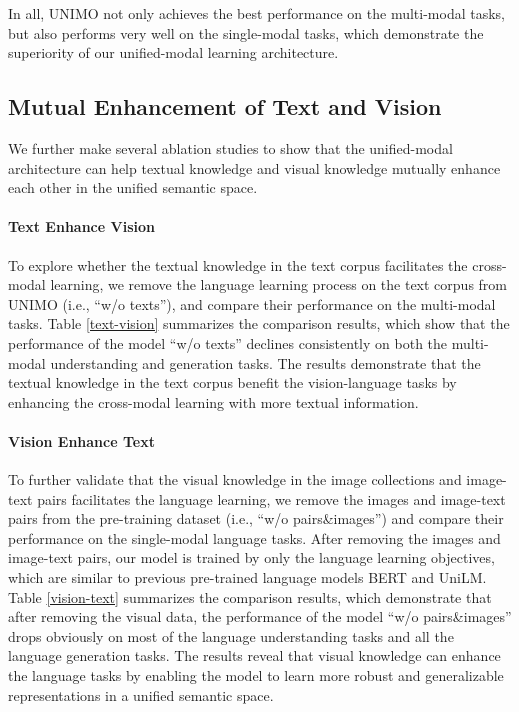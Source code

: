 \documentclass[11pt,a4paper]{article}
\begin{document}
In all, UNIMO not only achieves the best performance on the multi-modal tasks, but also performs very well on the single-modal tasks, which demonstrate the superiority of our unified-modal learning architecture.





\subsection{Mutual Enhancement of Text and Vision}
We further make several ablation studies to show that the unified-modal architecture can help textual knowledge and visual knowledge mutually enhance each other in the unified semantic space. 


\paragraph{Text Enhance Vision}
To explore whether the textual knowledge in the text corpus facilitates the cross-modal learning, we remove the language learning process on the text corpus from UNIMO (i.e., ``w/o texts''), and compare their performance on the multi-modal tasks.
Table \ref{text-vision} summarizes the comparison results, which show that the performance of the model ``w/o texts'' declines consistently on both the multi-modal understanding and generation tasks.
The results demonstrate that the textual knowledge in the text corpus benefit the vision-language tasks by enhancing the cross-modal learning with more textual information.



\paragraph{Vision Enhance Text}
To further validate that the visual knowledge in the image collections and image-text pairs facilitates the language learning, we remove the images and image-text pairs from the pre-training dataset (i.e., ``w/o pairs\&images'') and compare their performance on the single-modal language tasks.
After removing the images and image-text pairs, our model is trained by only the language learning objectives, which are similar to previous pre-trained language models BERT and UniLM.
Table \ref{vision-text} summarizes the comparison results, which demonstrate that after removing the visual data, the performance of the model ``w/o pairs\&images'' drops obviously on most of the language understanding tasks and all the language generation tasks.
The results reveal that visual knowledge can enhance the language tasks by enabling the model to learn more robust and generalizable representations in a unified semantic space.
\end{document}
